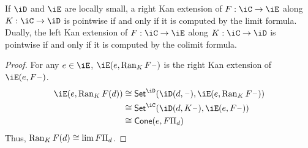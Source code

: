 \documentclass{amsart}
\begin{document}
\begin{thm}
  If $\iD$ and $\iE$ are locally small, a right Kan extension of $F : \iC \to \iE$ along $K : \iC \to \iD$ is pointwise if and only if it is computed by the limit formula.
  Dually, the left Kan extension of $F : \iC \to \iE$ along $K : \iC \to \iD$ is pointwise if and only if it is computed by the colimit formula.
\end{thm}
\begin{proof}
  For any $e \in \iE$, $\iE(e,\ran_{K}F\blank)$ is the right Kan extension of $\iE(e,F\blank)$.
  \begin{align}
    \iE(e, \ran_{K}F(d)) &\iso \mathsf{Set}^{\iD}(\iD(d, \blank), \iE(e, \ran_{K}F\blank))\\
                         &\iso \mathsf{Set}^{\iC}(\iD(d, K\blank), \iE(e, F\blank))\\
                         &\iso \mathsf{Cone}(e,F\Pi_{d})
  \end{align}
  Thus, $\operatorname{Ran}_{K}F(d) \cong \lim F\Pi_{d}$.
\end{proof}



\end{document}

